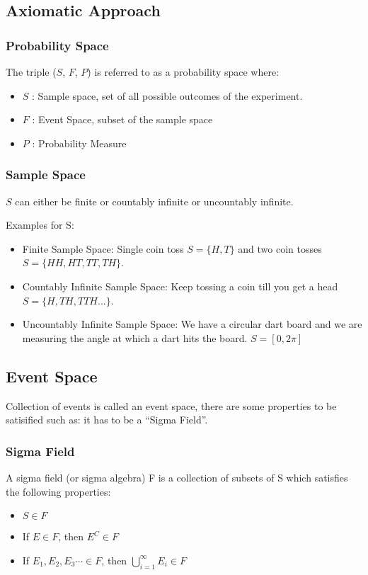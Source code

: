 \documentclass{article}
\begin{document}
         \subsection{Axiomatic Approach}

         \subsubsection{Probability Space}

The triple ($S$, $F$, $P$) is referred to as a probability space where:
\begin{itemize}
    \item $S$ : Sample space, set of all possible outcomes of the experiment.
    \item $F$ : Event Space, subset of the sample space
    \item $P$ : Probability Measure
\end{itemize}
\subsubsection{Sample Space}

$S$ can either be finite or countably infinite or uncountably infinite.

Examples for S:
\begin{itemize}
        \item Finite Sample Space: Single coin toss $ S=\{H,T\} $ and two coin tosses $ S=\{HH,HT,TT,TH\} $.
        \item Countably Infinite Sample Space: Keep tossing a coin till you get a head $ S=\{H,TH,TTH...\}$.
        \item Uncountably Infinite Sample Space: We have a circular dart board and we are measuring the angle at which a dart hits the board. $S=[0,2\pi]$
\end{itemize}

\subsection{Event Space}
Collection of events is called an event space, there are some properties to be satisified such as:
it has to be a ``Sigma Field''.

\subsubsection{Sigma Field}
A sigma field (or sigma algebra) F is a collection of subsets of S which satisfies the following properties:
\begin{itemize}
    \item $S \in F$
    \item If $E \in F$, then $E^C \in F$
    \item If $E_1,E_2,E_3 \cdots \in F $, then $\bigcup_{i=1}^{\infty} E_i \in F$
\end{itemize}
\end{document}
